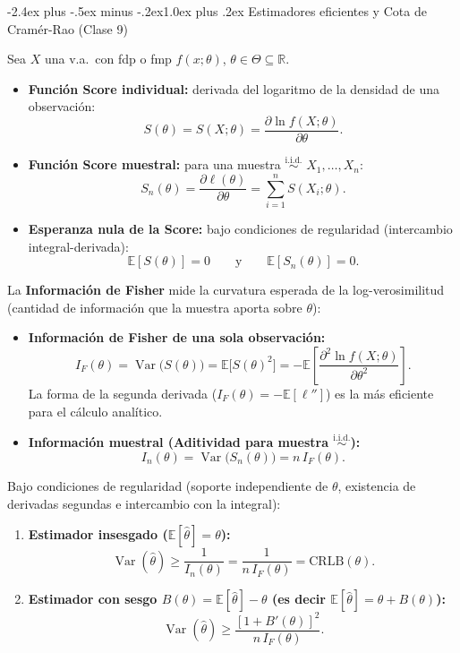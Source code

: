 \documentclass[10pt,a4paper]{article}
\makeatletter
\newcommand{\E}{\mathbb{E}}
\newcommand{\R}{\mathbb{R}}
\newcommand{\Var}{\operatorname{Var}}
\newcommand{\iid}{\overset{\text{i.i.d.}}{\sim}}
\renewcommand\section{\@startsection{section}{1}{0pt}%
  {-2.4ex plus -.5ex minus -.2ex}{1.0ex plus .2ex}%
  {\normalfont\large\bfseries\color{seccolor}}}
\makeatother
\begin{document}
\section{Estimadores eficientes y Cota de Cramér-Rao \textmd{(Clase 9)}}

\begin{defbox}[frametitle={Función Score de Fisher}]
Sea $X$ una v.a.\ con fdp o fmp $f(x;\theta)$, $\theta\in\Theta\subseteq\R$.
\begin{itemize}
  \item \textbf{Función Score individual:} derivada del logaritmo de la densidad de una observación:
  \[
  S(\theta) = S(X;\theta) = \frac{\partial \ln f(X;\theta)}{\partial \theta} .
  \]
  \item \textbf{Función Score muestral:} para una muestra $\iid$ $X_1,\dots,X_n$:
  \[
  S_n(\theta) = \frac{\partial \ell(\theta)}{\partial \theta} = \sum_{i=1}^n S(X_i;\theta).
  \]
  \item \textbf{Esperanza nula de la Score:} bajo condiciones de regularidad (intercambio integral-derivada):
  \[
  \E[S(\theta)] = 0 \qquad\text{y}\qquad \E[S_n(\theta)] = 0 .
  \]
\end{itemize}
\end{defbox}

\begin{defbox}[frametitle={Información de Fisher}]
La \textbf{Información de Fisher} mide la curvatura esperada de la log-verosimilitud (cantidad de información que la muestra aporta sobre $\theta$):
\begin{itemize}
  \item \textbf{Información de Fisher de una sola observación:}
  \[
  I_F(\theta) = \Var\big(S(\theta)\big) = \E\big[S(\theta)^2\big] = -\E\left[\frac{\partial^2 \ln f(X;\theta)}{\partial \theta^2}\right].
  \]
  La forma de la segunda derivada ($I_F(\theta) = -\E[\ell'']$) es la más eficiente para el cálculo analítico.
  \item \textbf{Información muestral (Aditividad para muestra $\iid$):}
  \[
  I_n(\theta) = \Var\big(S_n(\theta)\big) = n\,I_F(\theta).
  \]
\end{itemize}
\end{defbox}

\begin{thmbox}[frametitle={Cota Inferior de Cramér-Rao (CRLB)}]
Bajo condiciones de regularidad (soporte independiente de $\theta$, existencia de derivadas segundas e intercambio con la integral):
\begin{enumerate}
  \item \textbf{Estimador insesgado ($\E[\hat\theta]=\theta$):}
  \[
  \Var(\hat\theta) \ge \frac{1}{I_n(\theta)} = \frac{1}{n\,I_F(\theta)} = \text{CRLB}(\theta).
  \]
  \item \textbf{Estimador con sesgo $B(\theta) = \E[\hat\theta] - \theta$ (es decir $\E[\hat\theta] = \theta + B(\theta)$):}
  \[
  \Var(\hat\theta) \ge \frac{[1 + B'(\theta)]^2}{n\,I_F(\theta)}.
  \]
\end{enumerate}
\end{thmbox}
\end{document}
